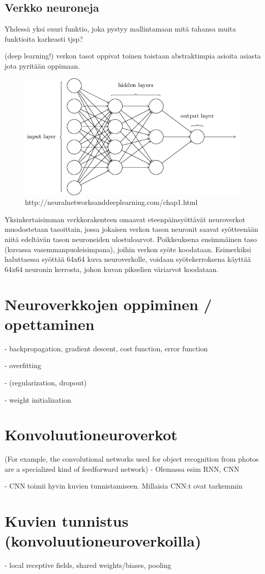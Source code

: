 \documentclass[11pt]{article}
\theoremstyle{plain}
\theoremstyle{definition}
\begin{document}
  \subsection{Verkko neuroneja}

  Yhdessä yksi suuri funktio, joka pystyy mallintamaan mitä tahansa muita funktioita karkeasti tjsp?

  (deep learning!) verkon tasot oppivat toinen toistaan abstraktimpia asioita asiasta jota pyritään oppimaan.

  \begin{figure}[h]
  \centering
  \includegraphics[scale=0.5]{basic-neuralnet}
  \caption{http://neuralnetworksanddeeplearning.com/chap1.html}
  \end{figure}

  Yksinkertaisimman verkkorakenteen omaavat eteenpäinsyöttävät neuroverkot muodostetaan tasoittain, jossa jokaisen verkon tason neuronit saavat syötteenään niitä edeltävän tason neuroneiden ulostuloarvot. Poikkeuksena ensimmäinen taso (kuvassa vasemmanpuoleisimpana), joihin verkon syöte koodataan. Esimerkiksi haluttaessa syöttää 64x64 kuva neuroverkolle, voidaan syötekerroksena käyttää 64x64 neuronin kerrosta, johon kuvan pikselien väriarvot koodataan.


  \section{Neuroverkkojen oppiminen / opettaminen}
  - backpropagation, gradient descent, cost function, error function

  - overfitting

  - (regularization, dropout)

  - weight initialization

  \section{Konvoluutioneuroverkot}
   (For example, the convolutional networks used for object recognition from photos are a specialized kind of feedforward network)
  - Olemassa esim RNN, CNN

  - CNN toimii hyvin kuvien tunnistamiseen. Millaisia CNN:t ovat tarkemmin
  \section{Kuvien tunnistus (konvoluutioneuroverkoilla)}
  - local receptive fields, shared weights/biases, pooling

  \renewcommand{\refname}{Lähteet}
  
  

  
\end{document}
